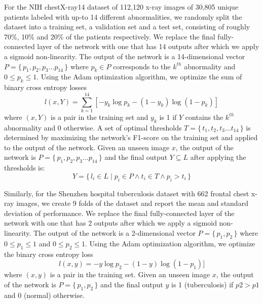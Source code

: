 \documentclass[12pt,oneside,a4paper]{report}
\begin{document}
For the NIH chestX-ray14 dataset of 112,120 x-ray images of 30,805 unique
patients labeled with up-to 14 different abnormalities, we randomly split the
dataset into a training set, a validation set and a test set, consisting of
roughly 70\%, 10\% and 20\% of the patients respectively. We replace the final
fully-connected layer of the network with one that has 14 outputs after which we
apply a sigmoid non-linearity. The output of the network is a 14-dimensional
vector $P = \{\,p_1, p_2, p_3 \dots p_{14}\,\}$ where $p_k \in P$ corresponds to
the $k^{th}$ abnormality and $0 \leq p_k \leq 1$. Using the
Adam\cite{kingma2014adam} optimization algorithm, we optimize the sum of binary
cross entropy losses
\begin{equation}
  l(x, Y) = \sum_{k=1} ^{14}[-y_k\log p_k-(1-y_k)\log (1-p_k)]
\end{equation}
where $(x, Y)$ is a pair in the training set and $y_k$ is 1 if $Y$ contains the
$k^{th}$ abnormality and 0 otherwise.
A set of optimal thresholds $T = \{\,t_1, t_2, t_3 \dots t_{14}\,\}$ is
determined by maximizing the network's F1-score on the training set and applied
to the output of the network. Given an unseen image $x$, the output of the
network is $P = \{\,p_1, p_2, p_3 \dots p_{14}\,\}$ and the final output $Y
\subseteq L$ after applying the thresholds is:
\begin{equation}
  Y = \{\,l_i \in L \mid p_i \in P \wedge t_i \in T \wedge p_i > t_i \,\}
\end{equation}

Similarly, for the Shenzhen hospital tuberculosis dataset with 662 frontal chest
x-ray images, we create 9 folds of the dataset and report the mean and standard
deviation of performance. We replace the final fully-connected layer of the
network with one that has 2 outputs after which we apply a sigmoid
non-linearity. The output of the network is a 2-dimensional vector $P = \{\,p_1,
p_2\,\}$ where $0 \leq p_1 \leq 1$ and $0 \leq p_2 \leq 1$. Using the Adam
optimization algorithm, we optimize the binary cross entropy loss
\begin{equation}
  l(x, y) = -y\log p_2-(1-y)\log (1-p_1)]
\end{equation}
where $(x, y)$ is a pair in the training set. Given an unseen image $x$, the
output of the network is $P = \{\,p_1, p_2\,\}$ and the final output $y$ is 1
(tuberculosis) if $p2 >
p1$ and 0 (normal) otherwise.\\
\end{document}

